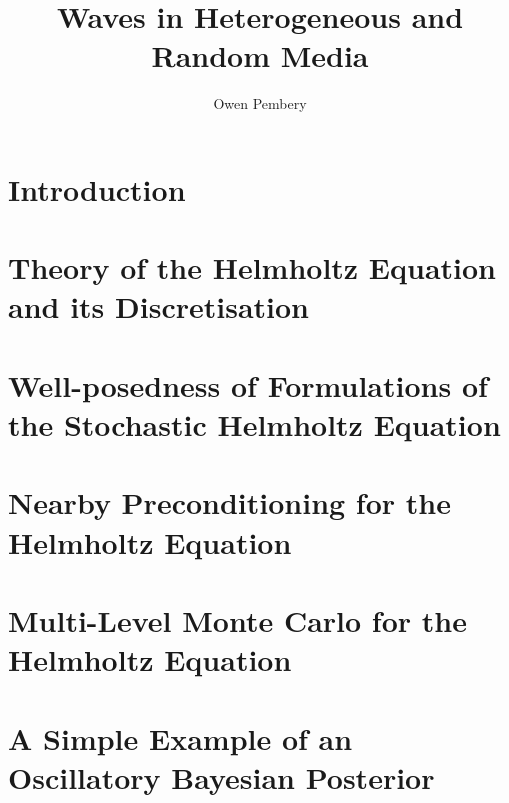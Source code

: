 \documentclass{report}
\title{Waves in Heterogeneous and Random Media}
\author{Owen Pembery}
\begin{document}
\maketitle

\chapter{Introduction}\label{chap:intro}


\chapter{Theory of the Helmholtz Equation and its Discretisation}\label{chap:background}


\chapter{Well-posedness of Formulations of the Stochastic Helmholtz Equation}\label{chap:stochastic}

\chapter{Nearby Preconditioning for the Helmholtz Equation}\label{chap:nbpc}

\chapter{Multi-Level Monte Carlo for the Helmholtz Equation}\label{chap:mlmc}

\appendix

\chapter{A Simple Example of an Oscillatory Bayesian Posterior}\label{app:osc}




\end{document}
